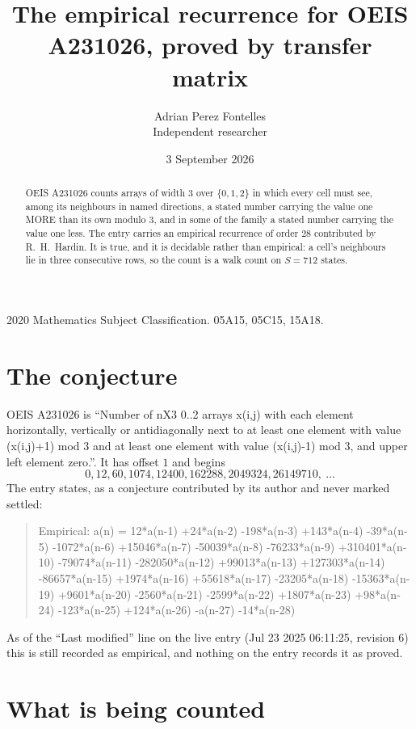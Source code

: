 \documentclass[11pt,a4paper]{article}
\title{The empirical recurrence for OEIS A231026, proved by transfer matrix}
\author{Adrian Perez Fontelles\\ \small Independent researcher}
\date{3 September 2026}
\theoremstyle{plain}
\theoremstyle{definition}
\begin{document}
\maketitle

\begin{abstract}
OEIS A231026 counts arrays of width $3$ over $\{0,1,2\}$ in which every cell must see, among its
neighbours in named directions, a stated number carrying the value one MORE than its own
modulo $3$, and in some of the family a stated number carrying the value one less. The entry
carries an empirical recurrence of order $28$ contributed by R.~H.~Hardin. It is true, and
it is decidable rather than empirical: a cell's neighbours lie in three consecutive rows, so
the count is a walk count on $S=712$ states.
\end{abstract}

\noindent\small 2020 Mathematics Subject Classification. 05A15, 05C15, 15A18.\normalsize

\section{The conjecture}

OEIS A231026 is ``Number of nX3 0..2 arrays x(i,j) with each element horizontally, vertically or antidiagonally next to at least one element with value (x(i,j)+1) mod 3 and at least one element with value (x(i,j)-1) mod 3, and upper left element zero.''. It has offset $1$ and begins
\[
0, 12, 60, 1074, 12400, 162288, 2049324, 26149710,\ \dots
\]
The entry states, as a conjecture contributed by its author and never marked settled:
\begin{quote}
Empirical: a(n) = 12*a(n-1) +24*a(n-2) -198*a(n-3) +143*a(n-4) -39*a(n-5) -1072*a(n-6) +15046*a(n-7) -50039*a(n-8) -76233*a(n-9) +310401*a(n-10) -79074*a(n-11) -282050*a(n-12) +99013*a(n-13) +127303*a(n-14) -86657*a(n-15) +1974*a(n-16) +55618*a(n-17) -23205*a(n-18) -15363*a(n-19) +9601*a(n-20) -2560*a(n-21) -2599*a(n-22) +1807*a(n-23) +98*a(n-24) -123*a(n-25) +124*a(n-26) -a(n-27) -14*a(n-28)
\end{quote}
As of the ``Last modified'' line on the live entry (Jul 23 2025 06:11:25, revision 6) this is still
recorded as empirical, and nothing on the entry records it as proved.

\section{What is being counted}
\end{document}
